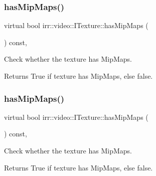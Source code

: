 \subsubsection{\texorpdfstring{has\+Mip\+Maps()}{hasMipMaps()}\hspace{0.1cm}{\footnotesize\ttfamily [1/2]}}
{\footnotesize\ttfamily virtual bool irr\+::video\+::\+I\+Texture\+::has\+Mip\+Maps (\begin{DoxyParamCaption}{ }\end{DoxyParamCaption}) const\hspace{0.3cm}{\ttfamily [inline]}, {\ttfamily [virtual]}}



Check whether the texture has Mip\+Maps. 

\begin{DoxyReturn}{Returns}
True if texture has Mip\+Maps, else false. 
\end{DoxyReturn}
\mbox{\label{classirr_1_1video_1_1ITexture_a9da815ed3b2a3efec45f957c6918fbba}} 
\subsubsection{\texorpdfstring{has\+Mip\+Maps()}{hasMipMaps()}\hspace{0.1cm}{\footnotesize\ttfamily [2/2]}}
{\footnotesize\ttfamily virtual bool irr\+::video\+::\+I\+Texture\+::has\+Mip\+Maps (\begin{DoxyParamCaption}{ }\end{DoxyParamCaption}) const\hspace{0.3cm}{\ttfamily [inline]}, {\ttfamily [virtual]}}



Check whether the texture has Mip\+Maps. 

\begin{DoxyReturn}{Returns}
True if texture has Mip\+Maps, else false. 
\end{DoxyReturn}
\mbox{\label{classirr_1_1video_1_1ITexture_aac5c0e281e1aa49365fdb7e7fa4d7342}} 

